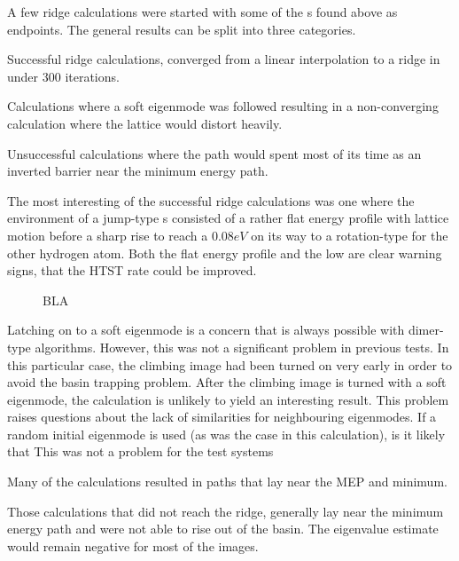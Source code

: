 A few ridge calculations were started with some of the s found above as endpoints.
The general results can be split into three categories.
\bit
\item Successful ridge calculations, converged from a linear interpolation to a ridge in under 300 iterations.
\item Calculations where a soft eigenmode was followed resulting in a non-converging calculation where the lattice would distort heavily.
\item Unsuccessful calculations where the path would spent most of its time as an inverted barrier near the minimum energy path.
\eit

The most interesting of the successful ridge calculations was one where the environment of a jump-type s consisted of a rather flat energy profile with lattice motion before a sharp rise to reach a $0.08\unit{eV}$  on its way to a rotation-type  for the other hydrogen atom.
Both the flat energy profile and the low  are clear warning signs, that the HTST rate could be improved.
\begin{figure}[htb]
\begin{center}
    \parbox{0.85\linewidth}{
      \caption{ BLA
      }
      \label{fig:semi-results}
    }
\end{center}
\end{figure}


Latching on to a soft eigenmode is a concern that is always possible with dimer-type algorithms.
However, this was not a significant problem in previous tests.
In this particular case, the climbing image had been turned on very early in order to avoid the basin trapping problem.
After the climbing image is turned with a soft eigenmode, the calculation is unlikely to yield an interesting result.
This problem raises questions about the lack of similarities for neighbouring eigenmodes.
If a random initial eigenmode is used (as was the case in this calculation), is it likely that \expand
This was not a problem for the test systems

Many of the calculations resulted in paths that lay near the MEP and minimum.


Those calculations that did not reach the ridge, generally lay near the minimum energy path and were not able to rise out of the basin.
The eigenvalue estimate would remain negative for most of the images.

